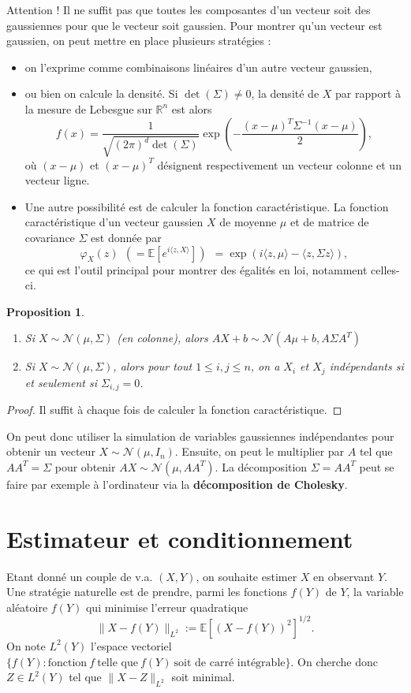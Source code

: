 \documentclass[a4paper,12pt]{book}
\newtheorem{propfr}[thmfr]{Proposition}
\begin{document}
Attention ! Il ne suffit pas que toutes les composantes d'un vecteur soit des gaussiennes pour que le vecteur soit gaussien. Pour montrer qu'un vecteur est gaussien, on peut mettre en place plusieurs stratégies :
\begin{itemize}
\item on l'exprime comme combinaisons linéaires d'un autre vecteur gaussien,
\item ou bien on calcule la densité. Si $\det(\Sigma)\neq 0$, la densité de $X$ par rapport à la mesure de Lebesgue sur $\mathbb{R}^n$ est alors
$$f(x)=\frac{1}{\sqrt{(2\pi)^d\det(\Sigma)}}\exp\left(-\frac{(x-\mu)^T\Sigma^{-1}(x-\mu)}{2}\right),$$
où $(x-\mu)$ et $(x-\mu)^T$ désignent respectivement un vecteur colonne et un vecteur ligne.
\item Une autre possibilité est de calculer la fonction caractéristique. La fonction caractéristique d'un vecteur gaussien $X$ de moyenne $\mu$ et de matrice de covariance $\Sigma$ est donnée par
$$\varphi_X(z)\ \ (=\mathbb{E}[e^{i\langle z,X\rangle}])\ \ =\exp(i \langle z,\mu\rangle -\langle z,\Sigma z\rangle),$$
ce qui est l'outil principal pour montrer des égalités en loi, notamment celles-ci.
\end{itemize}
\begin{propfr}\begin{enumerate}
\item Si $X\sim \mathcal{N}(\mu,\Sigma)$ (en colonne), alors $AX+b\sim \mathcal{N}(A\mu+b,A \Sigma A^T)$
\item Si $X\sim \mathcal{N}(\mu,\Sigma)$, alors pour tout $1\leq i,j\leq n$, on a $X_i$ et $X_j$ indépendants si et seulement si $\Sigma_{i,j}=0$.
\end{enumerate}
\end{propfr}
\begin{proof}
Il suffit à chaque fois de calculer la fonction caractéristique.
\end{proof}
On peut donc utiliser la simulation de variables gaussiennes indépendantes pour obtenir un vecteur $X\sim \mathcal{N}(\mu,I_n)$. Ensuite, on peut le multiplier par $A$ tel que $A A^T=\Sigma$ pour obtenir $AX\sim \mathcal{N}(\mu,AA^T)$. La décomposition $\Sigma=A A^T$ peut se faire par exemple à l'ordinateur via la \textbf{décomposition de Cholesky}.
\section{Estimateur et conditionnement}
Etant donné un couple de v.a. $(X,Y)$, on souhaite estimer $X$ en observant $Y$. Une stratégie naturelle est de prendre, parmi les fonctions $f(Y)$ de $Y$, la variable aléatoire $f(Y)$ qui minimise l'erreur quadratique
$$\|X-f(Y)\|_{L^2}:=\mathbb{E}[(X-f(Y))^2]^{1/2}.$$
On note $L^2(Y)$ l'espace vectoriel $\{f(Y):\text{fonction}\ f \ \text{telle que}\ f(Y)\ \text{soit de carré intégrable}\}.$ On cherche donc $Z\in L^2(Y)$ tel que $\|X-Z\|_{L^2}$ soit minimal.
\end{document}

